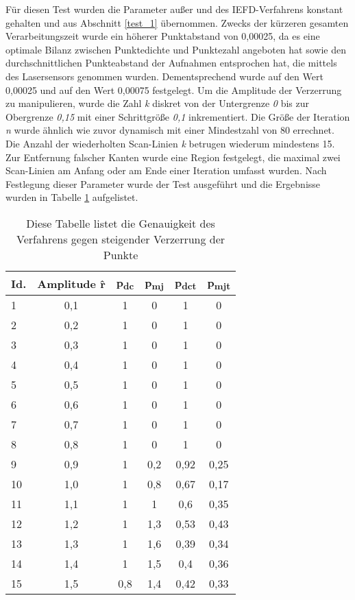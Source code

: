 Für diesen Test wurden die Parameter außer \distthresha und \distthreshb des IEFD-Verfahrens konstant gehalten und aus Abschnitt \ref{test_1} übernommen. Zwecks der kürzeren gesamten Verarbeitungszeit wurde ein höherer Punktabstand von 0,00025, da es eine optimale Bilanz zwischen Punktedichte und Punktezahl angeboten hat sowie den durchschnittlichen Punkteabstand der Aufnahmen entsprochen hat, die mittels des Lasersensors genommen wurden. Dementsprechend wurde \distthresha auf den Wert 0,00025 und \distthreshb auf den Wert 0,00075 festgelegt. Um die Amplitude der Verzerrung zu manipulieren, wurde die Zahl \textit{k} diskret von der Untergrenze \textit{0} bis zur Obergrenze \textit{0,15} mit einer Schrittgröße \textit{0,1} inkrementiert. Die Größe der Iteration \textit{n} wurde ähnlich wie zuvor dynamisch mit einer Mindestzahl von 80 errechnet. Die Anzahl der wiederholten Scan-Linien \textit{k} betrugen wiederum mindestens 15. Zur Entfernung falscher Kanten wurde eine Region festgelegt, die maximal zwei Scan-Linien am Anfang oder am Ende einer Iteration umfasst wurden. Nach Festlegung dieser Parameter wurde der Test ausgeführt und die Ergebnisse wurden in Tabelle \ref{table: point_distortion_results} aufgelistet.

\begin{table}[t]
	\centering
	\begin{tabular}[width=\textwidth]{l *{5}{c}}
		\hline
		\textbf{Id.} & \textbf{Amplitude \^{r}} & \textbf{p\textsubscript{dc}} & \textbf{p\textsubscript{mj}} & \textbf{p\textsubscript{dct}} & \textbf{p\textsubscript{mjt}} \\
		\hline
		1 & 0,1 & 1 & 0 & 1 & 0 \\
		2 & 0,2 & 1 & 0 & 1 & 0 \\
		3 & 0,3 & 1 & 0 & 1 & 0 \\
		4 & 0,4 & 1 & 0 & 1 & 0 \\
		5 & 0,5 & 1 & 0 & 1 & 0 \\
		6 & 0,6 & 1 & 0 & 1 & 0 \\
		7 & 0,7 & 1 & 0 & 1 & 0 \\
		8 & 0,8 & 1 & 0 & 1 & 0 \\
		9 & 0,9 & 1 & 0,2 & 0,92 & 0,25 \\
		10 & 1,0 & 1 & 0,8 & 0,67 & 0,17 \\
		11 & 1,1 & 1 & 1 & 0,6 & 0,35 \\
		12 & 1,2 & 1 & 1,3 & 0,53 & 0,43 \\
		13 & 1,3 & 1 & 1,6 & 0,39 & 0,34 \\
		14 & 1,4 & 1 & 1,5 & 0,4 & 0,36 \\
		15 & 1,5 & 0,8 & 1,4 & 0,42 & 0,33 \\
		\hline
	\end{tabular}
	\caption{Diese Tabelle listet die Genauigkeit des Verfahrens gegen steigender Verzerrung der Punkte}
	\label{table: point_distortion_results}
\end{table}

